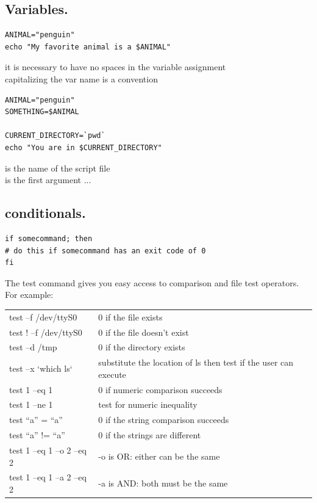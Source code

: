 \documentclass[10pt]{article}
\begin{document}
\subsection{Variables.}
\begin{verbatim}
ANIMAL="penguin"
echo "My favorite animal is a $ANIMAL"
\end{verbatim}
it is necessary to have no spaces in the variable assignment\\
capitalizing the var name is a convention\\
\begin{verbatim}
ANIMAL="penguin"
SOMETHING=$ANIMAL

CURRENT_DIRECTORY=`pwd`
echo "You are in $CURRENT_DIRECTORY"
\end{verbatim}
 is the name of the script file\\
 is the first argument ...\\
\subsection{conditionals.}
\begin{verbatim}
if somecommand; then
# do this if somecommand has an exit code of 0
fi
\end{verbatim}

The test command gives you easy access to comparison and file test operators. For example:\\
\begin{center}
	\begin{tabular}{|l|l|}
		\hline
		test –f /dev/ttyS0			& 0 if the file exists\\
		test ! –f /dev/ttyS0			& 0 if the file doesn’t exist\\
		test –d /tmp					& 0 if the directory exists\\
		test –x `which ls`				& substitute the location of ls then test if the user can execute\\
		test 1 –eq 1					& 0 if numeric comparison succeeds\\
		test 1 –ne 1					& test for numeric inequality\\
		test “a” = “a”					& 0 if the string comparison succeeds\\
		test “a” != “a”					& 0 if the strings are different\\
		test 1 –eq 1 –o 2 –eq 2			& -o is OR: either can be the same\\
		test 1 –eq 1 –a 2 –eq 2			& -a is AND: both must be the same\\

		\hline
	\end{tabular}
\end{center}
\end{document}
